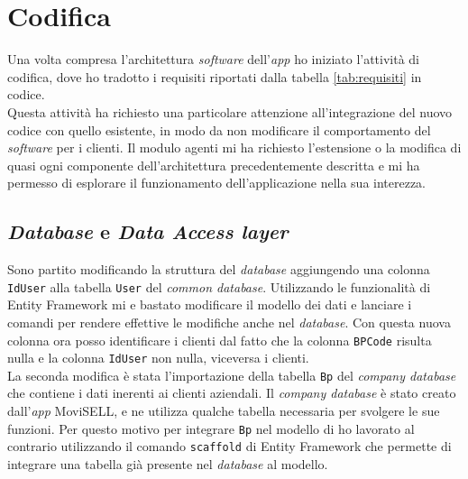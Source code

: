 \section{Codifica}

Una volta compresa l'architettura \textit{software} dell'\textit{app} ho iniziato l'attività di codifica, dove ho tradotto 
i requisiti riportati dalla tabella \ref{tab:requisiti} in codice.\\
Questa attività ha richiesto una particolare attenzione all'integrazione del nuovo codice con quello esistente, 
in modo da non modificare il comportamento del \textit{software} per i clienti. Il modulo agenti mi ha richiesto 
l'estensione o la modifica di quasi ogni componente dell'architettura precedentemente descritta e mi ha permesso 
di esplorare il funzionamento dell'applicazione nella sua interezza.

\subsection{\textit{Database} e \textit{Data Access layer}}
Sono partito modificando la struttura del \textit{database} aggiungendo una colonna \texttt{IdUser} alla tabella 
\texttt{User} del \textit{common database}. Utilizzando le funzionalità di Entity Framework mi e bastato modificare 
il modello dei dati e lanciare i comandi per rendere effettive le modifiche anche nel \textit{database}. Con questa 
nuova colonna ora posso identificare i clienti dal fatto che la colonna \texttt{BPCode} risulta nulla e la colonna 
\texttt{IdUser} non nulla, viceversa i clienti.\\
La seconda modifica è stata l'importazione della tabella \texttt{Bp} del \textit{company database} che contiene i 
dati inerenti ai clienti aziendali. Il \textit{company database} è stato creato dall'\textit{app} MoviSELL, e 
{\movi} ne utilizza qualche tabella necessaria per svolgere le sue funzioni. Per questo motivo per integrare 
\texttt{Bp} nel modello di {\movi} ho lavorato al contrario utilizzando il comando \texttt{scaffold} di 
Entity Framework che permette di integrare una tabella già presente nel \textit{database} al modello.\\


